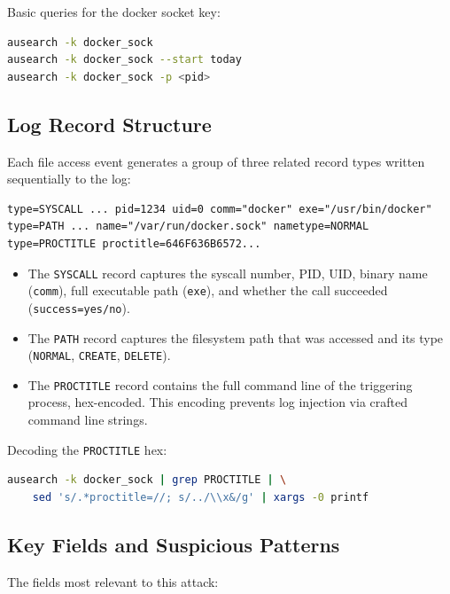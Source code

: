Basic queries for the docker socket key:

\begin{lstlisting}[language=bash]
ausearch -k docker_sock
ausearch -k docker_sock --start today
ausearch -k docker_sock -p <pid>
\end{lstlisting}

\subsection{Log Record Structure}

Each file access event generates a group of three related record types written sequentially to the log:

\begin{lstlisting}
type=SYSCALL ... pid=1234 uid=0 comm="docker" exe="/usr/bin/docker"
type=PATH ... name="/var/run/docker.sock" nametype=NORMAL
type=PROCTITLE proctitle=646F636B6572...
\end{lstlisting}

\begin{itemize}
    \item The \texttt{SYSCALL} record captures the syscall number, PID, UID, binary name (\texttt{comm}), full executable path (\texttt{exe}), and whether the call succeeded (\texttt{success=yes/no}).
    \item The \texttt{PATH} record captures the filesystem path that was accessed and its type (\texttt{NORMAL}, \texttt{CREATE}, \texttt{DELETE}).
    \item The \texttt{PROCTITLE} record contains the full command line of the triggering process, hex-encoded. This encoding prevents log injection via crafted command line strings.
\end{itemize}

Decoding the \texttt{PROCTITLE} hex:

\begin{lstlisting}[language=bash]
ausearch -k docker_sock | grep PROCTITLE | \
    sed 's/.*proctitle=//; s/../\\x&/g' | xargs -0 printf
\end{lstlisting}

\subsection{Key Fields and Suspicious Patterns}

The fields most relevant to this attack:

